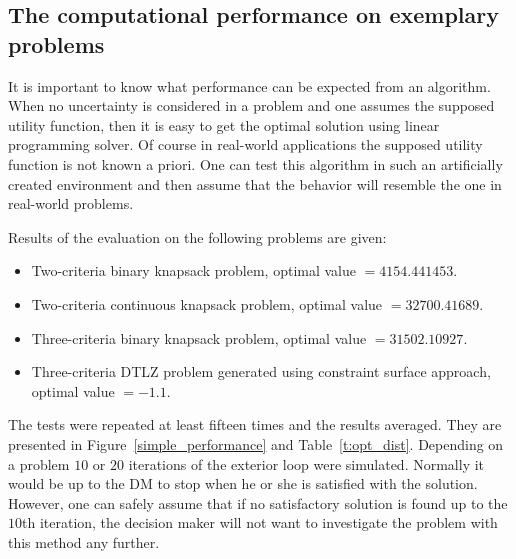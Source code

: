 \clearpage{}
\subsection{The computational performance on exemplary problems}
\label{nouncert-performance}
It is important to know what performance can be expected from an
algorithm. When no uncertainty is considered in a problem and one assumes the
supposed utility function, then it is easy to get the optimal solution using
linear programming solver. Of course in real-world applications the supposed
utility function is not known a priori. One can test this algorithm in such an
artificially created environment and then assume that the behavior will
resemble the one in real-world problems.

Results of the evaluation on the following problems are given:
\begin{itemize}
\item Two-criteria binary knapsack problem, optimal value $= 4154.441453$.
\item Two-criteria continuous knapsack problem, optimal value $= 32700.41689$.
\item Three-criteria binary knapsack problem, optimal value $= 31502.10927$.
\item Three-criteria DTLZ problem generated using constraint surface approach, optimal value $= -1.1$.
\end{itemize}

The tests were repeated at least fifteen times and the results averaged. They
are presented in Figure~\ref{simple_performance} and
Table~\ref{t:opt_dist}. Depending on a problem $10$ or $20$ iterations of the
exterior loop were simulated. Normally it would be up to the DM to stop when
he or she is satisfied with the solution. However, one can safely assume that
if no satisfactory solution is found up to the $10$th iteration, the decision
maker will not want to investigate the problem with this method any further.

